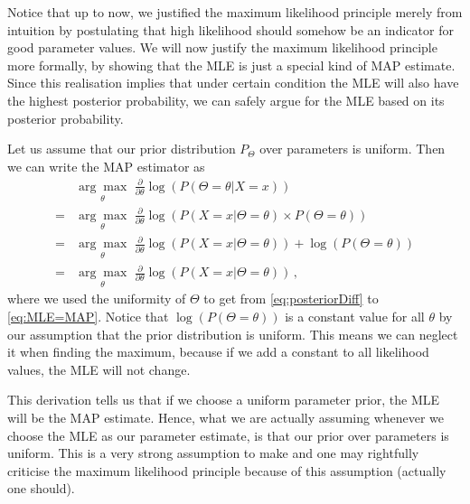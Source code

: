 Notice that up to now, we justified the maximum likelihood principle merely from intuition by postulating that high likelihood should somehow be an indicator for
good parameter values. We will now justify the maximum likelihood principle more formally, by showing that the MLE is just a special kind of MAP estimate. Since
this realisation implies that under certain condition the MLE will also have the highest posterior probability, we can safely argue for the MLE based on its posterior probability.

Let us assume that our prior distribution $ P_{\Theta} $ over parameters is uniform. Then we can write the MAP estimator as
\begin{align}
&\underset{\theta}{\arg\max}\, \, \frac{\partial}{\partial\theta} \log (P(\Theta = \theta| X=x)) \\
= &\underset{\theta}{\arg\max}\, \, \frac{\partial}{\partial\theta}\log (P(X=x|\Theta=\theta) \times P(\Theta = \theta)) \\
= &\underset{\theta}{\arg\max}\, \, \frac{\partial}{\partial\theta}\log (P(X=x|\Theta=\theta)) + \log(P(\Theta = \theta)) \label{eq:posteriorDiff} \\
= &\underset{\theta}{\arg\max}\, \, \frac{\partial}{\partial\theta}\log (P(X=x|\Theta=\theta)) \label{eq:MLE=MAP} \, ,
\end{align}
where we used the uniformity of $\Theta$ to get from \eqref{eq:posteriorDiff} to \eqref{eq:MLE=MAP}. Notice that $ \log(P(\Theta = \theta)) $ is a constant value for all $ \theta $ by our assumption that the prior distribution is uniform. This means we can neglect it when finding the maximum, because if we add a constant to all likelihood values, the MLE will not change. 

This derivation tells us that if we choose a uniform parameter prior, the MLE will be the MAP estimate. Hence, what we are actually assuming whenever we choose the MLE as
our parameter estimate, is that our prior over parameters is uniform. This is a very strong assumption to make and one may rightfully criticise the maximum likelihood principle because of this assumption (actually one should).

